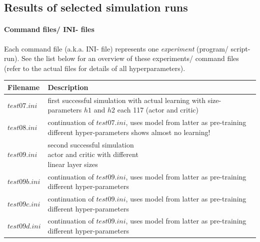 \documentclass[a4paper]{article}
\begin{document}
\subsection{Results of selected simulation runs}

\paragraph{Command files/ INI- files}
Each command file (a.k.a. INI- file) represents one \textit{experiment} (program/ script- run).
See the list below for an overview of these experiments/ command files
(refer to the actual files for details of all hyperparameters).
\\

\begin{tabular}{ |l|l| }
  \hline
Filename & Description \\
  \hline
$test07.ini$ & \makecell[tl]{first successful simulation with actual learning \\ with size- parameters $h1$ and $h2$ each 117 \\ (actor and critic)} \\
$test08.ini$ & \makecell[tl]{continuation of $test07.ini$, uses model \\ from latter as pre-training \\ different hyper-parameters \\ shows almost no learning!} \\
$test09.ini$ & \makecell[tl]{second successful simulation \\ actor and critic with different \\ linear layer sizes } \\
$test09b.ini$ & \makecell[tl]{continuation of $test09.ini$, uses model \\ from latter as pre-training \\ different hyper-parameters} \\
$test09c.ini$ & \makecell[tl]{continuation of $test09.ini$, uses model \\ from latter as pre-training \\ different hyper-parameters} \\
$test09d.ini$ & \makecell[tl]{continuation of $test09.ini$, uses model \\ from latter as pre-training \\ different hyper-parameters} \\
  \hline
\end{tabular}
\end{document}
